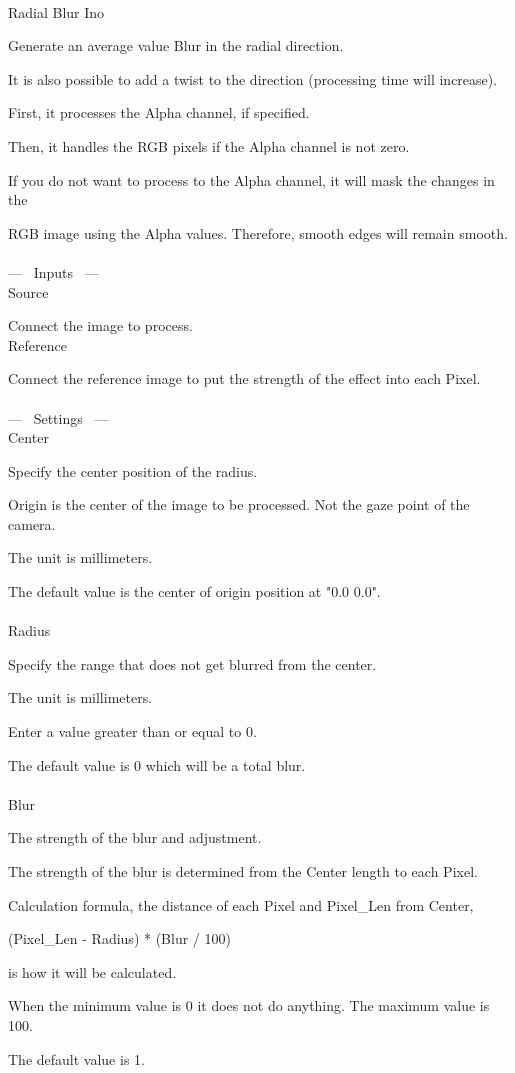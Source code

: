 \documentclass[a4paper,12pt]{article}
\begin{document}
\thispagestyle{empty}

\Large
\noindent \\
Radial Blur Ino\medskip
\par
\normalsize
Generate an average value Blur in the radial direction.\par
It is also possible to add a twist to the direction (processing time will increase).\\
\par
First, it processes the Alpha channel, if specified.\par
Then, it handles the RGB pixels if the Alpha channel is not zero.\par
If you do not want to process to the Alpha channel, it will mask the changes in the\par
RGB image using the Alpha values. Therefore, smooth edges will remain smooth.\\
\\
--- \ Inputs \ ---\\
Source\par
Connect the image to process.\\
Reference\par
Connect the reference image to put the strength of the effect into each Pixel.\\
\\
--- \ Settings \ ---\\
Center\par
Specify the center position of the radius.\par
Origin is the center of the image to be processed. Not the gaze point of the camera.\par
The unit is millimeters.\par
The default value is the center of origin position at "0.0 0.0".\\
\\
Radius\par
Specify the range that does not get blurred from the center.\par
The unit is millimeters.\par
Enter a value greater than or equal to 0.\par
The default value is 0 which will be a total blur.\\
\\
Blur\par
The strength of the blur and adjustment.\par
The strength of the blur is determined from the Center length to each Pixel.\par
Calculation formula, the distance of each Pixel and Pixel\_Len from Center,\par
(Pixel\_Len - Radius) * (Blur / 100)\par
is how it will be calculated.\par
When the minimum value is 0 it does not do anything. The maximum value is 100.\par
The default value is 1.
\end{document}
